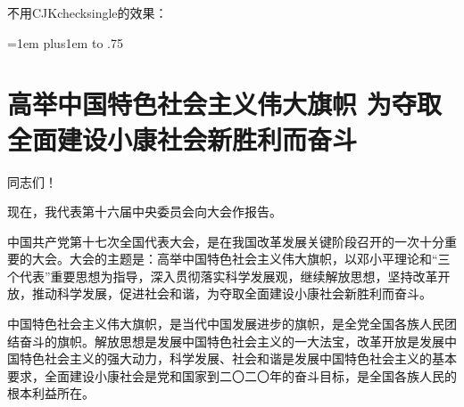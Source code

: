 \bigskip
不用CJKchecksingle的效果：

\def\xeCJK@i@i{\CJKglue\CJKsymbol}
\sometexts

\endgroup

\bigskip\bigskip


\bigskip\bigskip




\begingroup

\bigskip\bigskip

\xeCJKenablefallback

\vbox{\tabskip=1em plus1em \offinterlineskip
\def\tablerule{\noalign{\hrule}}
\halign to .75}

\endgroup





\chapter{高举中国特色社会主义伟大旗帜 为夺取全面建设小康社会新胜利而奋斗}
\date{2007.10.15}

同志们！

现在，我代表第十六届中央委员会向大会作报告。

中国共产党第十七次全国代表大会，是在我国改革发展关键阶段召开的一次十分重要的大会。大会的主题是：高举中国特色社会主义伟大旗帜，以邓小平理论和“三个代表”重要思想为指导，深入贯彻落实科学发展观，继续解放思想，坚持改革开放，推动科学发展，促进社会和谐，为夺取全面建设小康社会新胜利而奋斗。

中国特色社会主义伟大旗帜，是当代中国发展进步的旗帜，是全党全国各族人民团结奋斗的旗帜。解放思想是发展中国特色社会主义的一大法宝，改革开放是发展中国特色社会主义的强大动力，科学发展、社会和谐是发展中国特色社会主义的基本要求，全面建设小康社会是党和国家到二〇二〇年的奋斗目标，是全国各族人民的根本利益所在。

